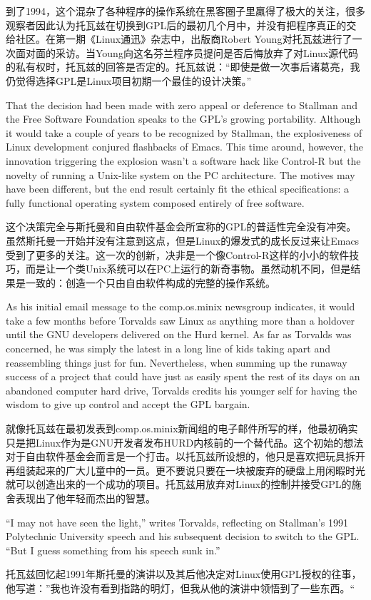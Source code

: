 \ifdefined\chs
到了1994，这个混杂了各种程序的操作系统在黑客圈子里羸得了极大的关注，很多观察者因此认为托瓦兹在切换到GPL后的最初几个月中，并没有把程序真正的交给社区。在第一期《Linux通迅》杂志中，出版商Robert Young对托瓦兹进行了一次面对面的采访。当Young向这名芬兰程序员提问是否后悔放弃了对Linux源代码的私有权时，托瓦兹的回答是否定的。托瓦兹说：``即使是做一次事后诸葛亮，我仍觉得选择GPL是Linux项目初期一个最佳的设计决策。''
\fi

\ifdefined\eng
That the decision had been made with zero appeal or deference to Stallman and the Free Software Foundation speaks to the GPL's growing portability. Although it would take a couple of years to be recognized by Stallman, the explosiveness of Linux development conjured flashbacks of Emacs. This time around, however, the innovation triggering the explosion wasn't a software hack like Control-R but the novelty of running a Unix-like system on the PC architecture. The motives may have been different, but the end result certainly fit the ethical specifications: a fully functional operating system composed entirely of free software.
\fi

\ifdefined\chs
这个决策完全与斯托曼和自由软件基金会所宣称的GPL的普适性完全没有冲突。虽然斯托曼一开始并没有注意到这点，但是Linux的爆发式的成长反过来让Emacs受到了更多的关注。这一次的创新，决非是一个像Control-R这样的小小的软件技巧，而是让一个类Unix系统可以在PC上运行的新奇事物。虽然动机不同，但是结果是一致的：创造一个只由自由软件构成的完整的操作系统。
\fi

\ifdefined\eng
As his initial email message to the comp.os.minix newsgroup indicates, it would take a few months before Torvalds saw Linux as anything more than a holdover until the GNU developers delivered on the Hurd kernel. As far as Torvalds was concerned, he was simply the latest in a long line of kids taking apart and reassembling things just for fun. Nevertheless, when summing up the runaway success of a project that could have just as easily spent the rest of its days on an abandoned computer hard drive, Torvalds credits his younger self for having the wisdom to give up control and accept the GPL bargain.
\fi

\ifdefined\chs
就像托瓦兹在最初发表到comp.os.minix新闻组的电子邮件所写的样，他最初确实只是把Linux作为是GNU开发者发布HURD内核前的一个替代品。这个初始的想法对于自由软件基金会而言是一个打击。以托瓦兹所设想的，他只是喜欢把玩具拆开再组装起来的广大儿童中的一员。更不要说只要在一块被废弃的硬盘上用闲暇时光就可以创造出来的一个成功的项目。托瓦兹用放弃对Linux的控制并接受GPL的施舍表现出了他年轻而杰出的智慧。
\fi

\ifdefined\eng
``I may not have seen the light,'' writes Torvalds, reflecting on Stallman's 1991 Polytechnic University speech and his subsequent decision to switch to the GPL. ``But I guess something from his speech sunk in.''
\fi

\ifdefined\chs
托瓦兹回忆起1991年斯托曼的演讲以及其后他决定对Linux使用GPL授权的往事，他写道：''我也许没有看到指路的明灯，但我从他的演讲中领悟到了一些东西。`` 
\fi

\theendnotes
\setcounter{endnote}{0}
